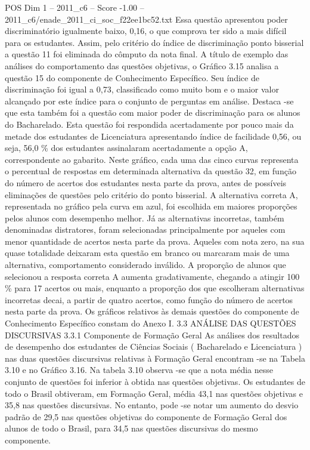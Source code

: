 \begin{textsample}{POS Dim 1 – 2011\_c6 – Score -1.00 – 2011\_c6/enade\_2011\_ci\_soc\_f22ee1bc52.txt}
Essa questão apresentou poder discriminatório igualmente baixo, 0,16, o que comprova ter sido a mais difícil para os estudantes.
Assim, pelo critério do índice de discriminação ponto bisserial a questão 11 foi eliminada do cômputo da nota final.
A título de exemplo das análises do comportamento das questões objetivas, o Gráfico 3.15 analisa a questão 15 do componente de Conhecimento Específico.
Seu índice de discriminação foi igual a 0,73, classificado como muito bom e o maior valor alcançado por este índice para o conjunto de perguntas em análise.
Destaca -se que esta também foi a questão com maior poder de discriminação para os alunos do Bacharelado.
Esta questão foi respondida acertadamente por pouco mais da metade dos estudantes de Licenciatura apresentando índice de facilidade 0,56, ou seja, 56,0 \% dos estudantes assinalaram acertadamente a opção A, correspondente ao gabarito.
Neste gráfico, cada uma das cinco curvas representa o percentual de respostas em determinada alternativa da questão 32, em função do número de acertos dos estudantes nesta parte da prova, antes de possíveis eliminações de questões pelo critério do ponto bisserial.
A alternativa correta A, representada no gráfico pela curva em azul, foi escolhida em maiores proporções pelos alunos com desempenho melhor.
Já as alternativas incorretas, também denominadas distratores, foram selecionadas principalmente por aqueles com menor quantidade de acertos nesta parte da prova.
Aqueles com nota zero, na sua quase totalidade deixaram esta questão em branco ou marcaram mais de uma alternativa, comportamento considerado inválido.
A proporção de alunos que selecionou a resposta correta A aumenta gradativamente, chegando a atingir 100 \% para 17 acertos ou mais, enquanto a proporção dos que escolheram alternativas incorretas decai, a partir de quatro acertos, como função do número de acertos nesta parte da prova.
Os gráficos relativos às demais questões do componente de Conhecimento Específico constam do Anexo I. 3.3 ANÁLISE DAS QUESTÕES DISCURSIVAS 3.3.1 Componente de Formação Geral As análises dos resultados de desempenho dos estudantes de Ciências Sociais ( Bacharelado e Licenciatura ) nas duas questões discursivas relativas à Formação Geral encontram -se na Tabela 3.10 e no Gráfico 3.16.
Na tabela 3.10 observa -se que a nota média nesse conjunto de questões foi inferior à obtida nas questões objetivas.
Os estudantes de todo o Brasil obtiveram, em Formação Geral, média 43,1 nas questões objetivas e 35,8 nas questões discursivas.
No entanto, pode -se notar um aumento do desvio padrão de 29,5 nas questões objetivas do componente de Formação Geral dos alunos de todo o Brasil, para 34,5 nas questões discursivas do mesmo componente.

\end{textsample}
